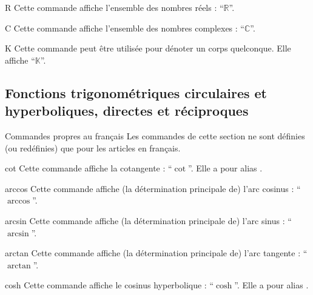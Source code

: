 \begin{docCommand}{R}{}
  Cette commande affiche l'ensemble des nombres réels : \enquote{$\mathbb{R}$}.
\end{docCommand}

\begin{docCommand}{C}{}
  Cette commande affiche l'ensemble des nombres complexes :
  \enquote{$\mathbb{C}$}.
\end{docCommand}

\begin{docCommand}{K}{}
  Cette commande peut être utilisée pour dénoter un corps quelconque. Elle
  affiche \enquote{$\mathbb{K}$}.
\end{docCommand}

\subsection[Fonctions trigonométriques circulaires et hyperboliques]{Fonctions
  trigonométriques circulaires et hyperboliques, directes et réciproques}

\begin{dbremark}{Commandes propres au français}{}
  Les commandes de cette section ne sont définies (ou redéfinies) que pour les
  articles en français.
\end{dbremark}

\begin{docCommand}{cot}{}
  Cette commande affiche la cotangente : \enquote{$\cot$}. Elle a pour alias
  .
\end{docCommand}

\begin{docCommand}{arccos}{}
  Cette commande affiche (la détermination principale de) l'arc cosinus :
  \enquote{$\arccos$}.
\end{docCommand}

\begin{docCommand}{arcsin}{}
  Cette commande affiche (la détermination principale de) l'arc sinus :
  \enquote{$\arcsin$}.
\end{docCommand}

\begin{docCommand}{arctan}{}
  Cette commande affiche (la détermination principale de) l'arc tangente :
  \enquote{$\arctan$}.
\end{docCommand}

\begin{docCommand}{cosh}{}
  Cette commande affiche le cosinus hyperbolique : \enquote{$\cosh$}. Elle a pour
  alias .
\end{docCommand}

